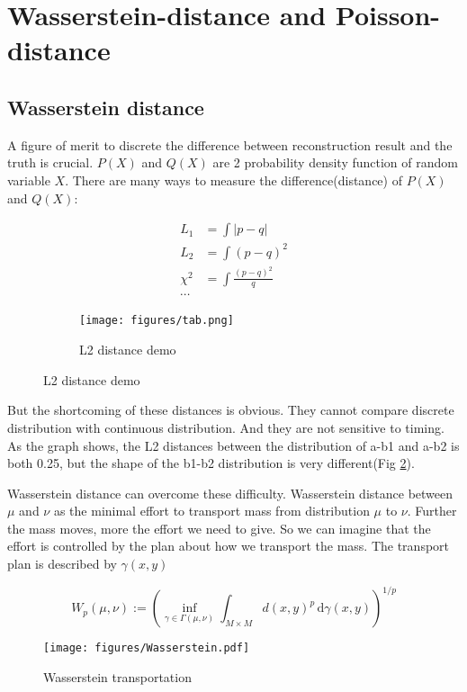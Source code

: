 \section{Wasserstein-distance and Poisson-distance} %
\subsection{Wasserstein distance}
A figure of merit to discrete the difference between reconstruction result and the truth is crucial. $P(X)$ and $Q(X)$ are 2 probability density function of random variable $X$. There are many ways to measure the difference(distance) of $P(X)$ and $Q(X)$: 

\begin{figure}[H]
\begin{minipage}{.5\textwidth}
\begin{align*}
    L_{1} &= \int|p-q| \\
    L_{2} &= \int(p-q)^{2} \\
    \chi^{2} &= \int\frac{(p-q)^{2}}{q} \\
    \cdots
\end{align*}
\end{minipage}
\begin{minipage}{.5\textwidth}
\begin{figure}[H]
    \centering
    \texttt{[image: figures/tab.png]}
    \caption{L2 distance demo}
    \label{fig:l2}
\end{figure}
\end{minipage}
\end{figure}

But the shortcoming of these distances is obvious. They cannot compare discrete distribution with continuous distribution. And they are not sensitive to timing. As the graph shows, the L2 distances between the distribution of a-b1 and a-b2 is both 0.25, but the shape of the b1-b2 distribution is very different(Fig \ref{fig:l2}). 

Wasserstein distance can overcome these difficulty. Wasserstein distance between $\mu$ and $\nu$ as the minimal effort to transport mass from distribution $\mu$ to $\nu$. Further the mass moves, more the effort we need to give. So we can imagine that the effort is controlled by the plan about how we transport the mass. The transport plan is described by $\gamma(x, y)$

\label{sub:Wasserstein distance}
    \begin{equation}
        W_{p}(\mu ,\nu ):=\left(\inf _{\gamma \in \Gamma (\mu ,\nu )}\int _{M\times M}d(x,y)^{p}\,\mathrm {d} \gamma (x,y)\right)^{1/p}
        \label{eq:w-dist-def}
    \end{equation}
    \begin{figure}[H]
        \centering
            \texttt{[image: figures/Wasserstein.pdf]}
        \caption{Wasserstein transportation}
        \label{fig:Wasserstein transportation}
    \end{figure}

